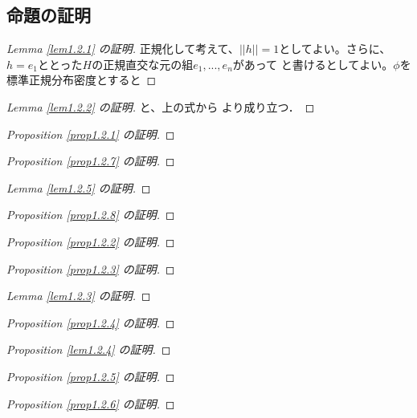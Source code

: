 \subsection{命題の証明}
\begin{proof}[Lemma \ref{lem1.2.1} の証明]

正規化して考えて、$||h||=1$としてよい。さらに、$h=e_1$ととった$H$の正規直交な元の組$e_1,...,e_n$があって
と書けるとしてよい。$\phi$を標準正規分布密度とすると
\end{proof}
\begin{proof}[Lemma \ref{lem1.2.2} の証明]
と、上の式から
より成り立つ．
\end{proof}
\begin{proof}[Proposition \ref{prop1.2.1} の証明]
\end{proof}
\begin{proof}[Proposition \ref{prop1.2.7} の証明]
\end{proof}
\begin{proof}[Lemma \ref{lem1.2.5} の証明]
\end{proof}
\begin{proof}[Proposition \ref{prop1.2.8} の証明]
\end{proof}
\begin{proof}[Proposition \ref{prop1.2.2} の証明]
\end{proof}
\begin{proof}[Proposition \ref{prop1.2.3} の証明]
\end{proof}
\begin{proof}[Lemma \ref{lem1.2.3} の証明]
\end{proof}
\begin{proof}[Proposition \ref{prop1.2.4} の証明]
\end{proof}
\begin{proof}[Proposition \ref{lem1.2.4} の証明]
\end{proof}
\begin{proof}[Proposition \ref{prop1.2.5} の証明]
\end{proof}
\begin{proof}[Proposition \ref{prop1.2.6} の証明]
\end{proof}

